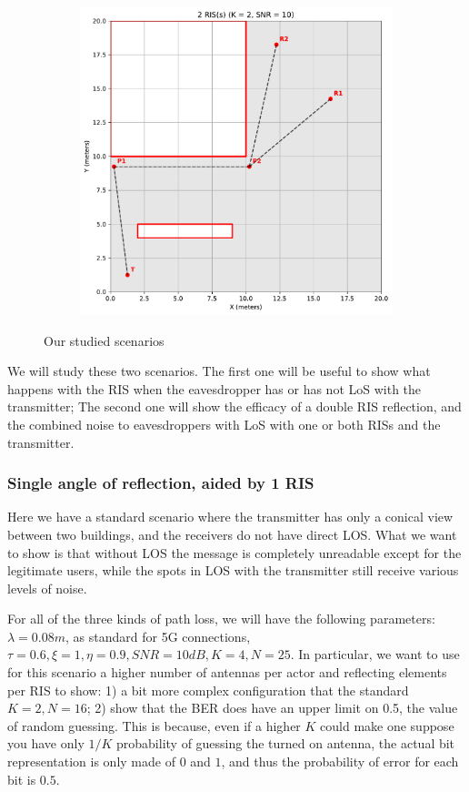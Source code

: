 \begin{figure}[H]
\begin{subfigure}[b]{0.48\textwidth}
    \includegraphics[width=\textwidth]{imgs/heatmap-simulations/2 RIS(s) (K = 2, SNR = 10).pdf}
  \end{subfigure}
  \caption{Our studied scenarios}
\end{figure}

We will study these two scenarios. The first one will be useful to show what happens with the RIS when the eavesdropper has or has not LoS with the transmitter; The second one will show the efficacy of a double RIS reflection, and the combined noise to eavesdroppers with LoS with one or both RISs and the transmitter.

\subsubsection{Single angle of reflection, aided by 1 RIS}

Here we have a standard scenario where the transmitter has only a conical view between two buildings, and the receivers do not have direct LOS. What we want to show is that without LOS the message is completely unreadable except for the legitimate users, while the spots in LOS with the transmitter still receive various levels of noise.

For all of the three kinds of path loss, we will have the following parameters: $\lambda = 0.08m$, as standard for 5G connections, $ \tau = 0.6, \xi = 1, \eta = 0.9, SNR = 10dB, K = 4, N = 25$. In particular, we want to use for this scenario a higher number of antennas per actor and reflecting elements per RIS to show: 1) a bit more complex configuration that the standard $K = 2, N = 16$; 2) show that the BER does have an upper limit on 0.5, the value of random guessing. This is because, even if a higher $K$ could make one suppose you have only $1/K$ probability of guessing the turned on antenna, the actual bit representation is only made of $0$ and $1$, and thus the probability of error for each bit is $0.5$.

